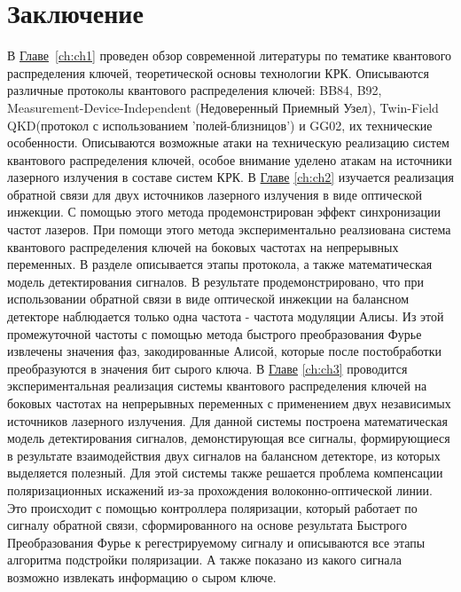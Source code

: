 \chapter*{Заключение} 
\setcounter{table}{2}                       %
В \underline{Главе}~\ref{ch:ch1} проведен обзор современной литературы по тематике квантового распределения ключей, теоретической основы технологии КРК. Описываются различные протоколы квантового распределения ключей: BB84, B92, Measurement-Device-Independent (Недоверенный Приемный Узел), Twin-Field QKD(протокол с использованием 'полей-близницов') и GG02, их технические особенности.
Описываются возможные атаки на техническую реализацию систем квантового распределения ключей, особое внимание уделено атакам на источники лазерного излучения в составе систем КРК.
\newline В \underline{Главе} \ref{ch:ch2} изучается реализация обратной связи для двух источников лазерного излучения в виде оптической инжекции. С помощью этого метода продемонстрирован эффект синхронизации частот лазеров. При помощи этого метода экспериментально реалзиована система квантового распределения ключей на боковых частотах на непрерывных переменных.
В разделе описывается этапы протокола, а также математическая модель детектирования сигналов. В результате продемонстрировано, что при использовании обратной связи в виде оптической инжекции на балансном детекторе наблюдается только одна частота - частота модуляции Алисы. Из этой промежуточной частоты с помощью метода быстрого преобразования Фурье извлечены значения фаз, закодированные Алисой, которые после постобработки преобразуются в значения бит сырого ключа.
\newline В \underline{Главе} \ref{ch:ch3} проводится экспериментальная реализация системы квантового распределения ключей на боковых частотах на непрерывных переменных с применением двух независимых источников лазерного излучения. Для данной системы построена математическая модель детектирования сигналов, демонстирующая все сигналы, формирующиеся в результате взаимодействия двух сигналов на балансном детекторе, из которых выделяется полезный.
Для этой системы также решается проблема компенсации поляризационных искажений из-за прохождения волоконно-оптической линии. Это происходит с помощью контроллера поляризации, который работает по сигналу обратной связи, сформированного на основе результата Быстрого Преобразования Фурье к регестрируемому сигналу и описываются все этапы алгоритма подстройки поляризации. А также показано из какого сигнала возможно извлекать информацию о сыром ключе.
